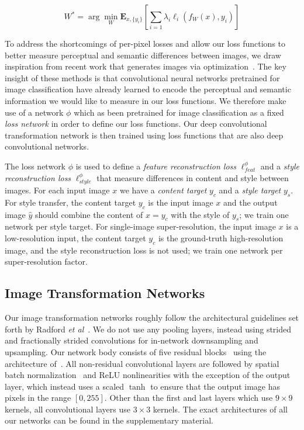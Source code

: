\documentclass[runningheads]{llncs}
\newcommand{\Ex}[2]{\mathbf{E}_{#1}\left[#2\right]}
\newcommand{\etal}{\textit{et al}}
\begin{document}
\begin{equation}
  W^* = \arg\min_W \Ex{x, \{y_i\}}{\sum_{i=1} \lambda_i \ell_i(f_W(x), y_i)}
\end{equation}

To address the shortcomings of per-pixel losses and allow our loss functions to better
measure perceptual and semantic differences between images, we draw inspiration from recent
work that generates images via optimization~\cite{mahendran15understanding,simonyan2013deep,yosinski2015understanding,Gatys2015b,gatys2015neural}.
The key insight of these methods is that convolutional neural networks pretrained for image
classification have already learned to encode the perceptual and semantic information we
would like to measure in our loss functions. We therefore make use of a network $\phi$
which as been pretrained for image classification as a fixed \emph{loss network} in order
to define our loss functions. Our deep convolutional transformation network is then trained
using loss functions that are also deep convolutional networks.

The loss network $\phi$ is used to define a \emph{feature reconstruction loss}
$\ell_{feat}^\phi$ and a \emph{style reconstruction loss} $\ell_{style}^\phi$ that measure
differences in content and style between images. For each input image $x$ we have a
\emph{content target} $y_c$ and a \emph{style target} $y_s$. For style transfer, the content
target $y_c$ is the input image $x$ and the output image $\hat y$ should combine the content of
$x=y_c$ with the style of $y_s$; we train one network per style target. For single-image
super-resolution, the input image $x$ is a low-resolution input, the content target $y_c$ is
the ground-truth high-resolution image, and the style reconstruction loss is not used; we
train one network per super-resolution factor.










\subsection{Image Transformation Networks}
\label{sec:arch}
Our image transformation networks roughly follow the architectural guidelines set forth
by Radford \etal~\cite{radford2015unsupervised}. We do not use any pooling layers, instead
using strided and fractionally strided convolutions for in-network downsampling and upsampling.
Our network body consists of five residual blocks~\cite{he2015deep} using the architecture
of~\cite{gross2016training}. All non-residual convolutional layers are followed by spatial batch
normalization~\cite{ioffe2015batch} and ReLU nonlinearities with the exception of the output
layer, which instead uses a scaled $\tanh$ to ensure that the output image has pixels in the
range $[0, 255]$. Other than the first and last layers which use $9\times9$ kernels, all
convolutional layers use $3\times3$ kernels. The exact architectures of all our networks
can be found in the supplementary material.
\end{document}

